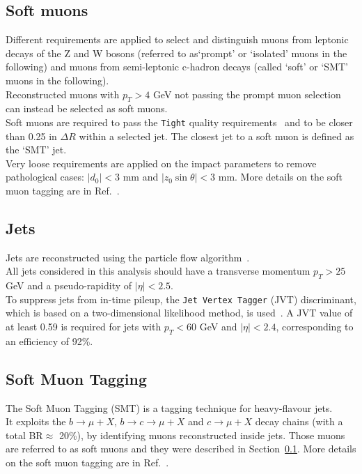 \subsection{Soft muons}
\label{sec:object:soft_muons}
Different requirements are applied to select and distinguish muons 
from leptonic decays of the Z and W bosons 
(referred to as`prompt' or `isolated' muons in the following) 
and muons from semi-leptonic c-hadron decays 
(called `soft' or `SMT' muons in the following). \\
Reconstructed muons with $p_{T} > 4 $ GeV not passing 
the prompt muon selection can instead be selected as soft muons.\\
Soft muons are required to pass the \texttt{Tight} quality requirements~\cite{muon2015} 
and to be closer than 0.25 in $\Delta R$ within a selected jet. 
The closest jet to a soft muon is defined as the `SMT' jet. \\
Very loose requirements are applied on the impact parameters to remove
pathological cases: 
$|d_0| < 3$ mm and $|z_0 \sin\theta| < 3$  mm.
More details on the soft muon tagging are in Ref.~\cite{SMT-INT-13TeV}.

\FloatBarrier
\subsection{Jets}
\label{sec:object:jet}
Jets are reconstructed 
using the particle flow algorithm~\cite{PERF-2015-09}. \\
All jets considered in this analysis should have a transverse
momentum $p_{T} > 25$ GeV and a pseudo-rapidity of
$|\eta|\!<\!2.5$.\\
To suppress jets from in-time pileup, the \texttt{Jet Vertex Tagger} (JVT)
discriminant, which is based on a two-dimensional likelihood
method, is used~\cite{ATLAS-CONF-2014-018}. A JVT value of at least
0.59 is required for jets with $p_{T}< 60$ GeV
and $|\eta|\!<\!2.4$, corresponding to an efficiency of 92\%.


\subsection{Soft Muon Tagging}
\label{sec:object:smt}
The Soft Muon Tagging (SMT) is a tagging technique for heavy-flavour jets.\\
 It exploits the $b \rightarrow \mu + X$,
 $b \rightarrow c \rightarrow \mu + X$ and $c \rightarrow \mu + X$ decay chains (with a total BR$\approx$ 20\%), by identifying muons reconstructed inside jets. Those muons are referred to as soft muons and they were described in Section~\ref{sec:object:soft_muons}.
 More details on the soft muon tagging are in Ref.~\cite{SMT-INT-13TeV}.

